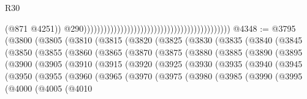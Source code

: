 \begin{lexlean}{R30}
\begin{coremodule}
                                                                                              (@871
                                                                                                @4251))
                                                                                            @290))))))))))))))))))))))))))))))))))))))))))))
@4348 := @3795
    (@3800
      (@3805
        (@3810
          (@3815
            (@3820
              (@3825
                (@3830
                  (@3835
                    (@3840
                      (@3845
                        (@3850
                          (@3855
                            (@3860
                              (@3865
                                (@3870
                                  (@3875
                                    (@3880
                                      (@3885
                                        (@3890
                                          (@3895
                                            (@3900
                                              (@3905
                                                (@3910
                                                  (@3915
                                                    (@3920
                                                      (@3925
                                                        (@3930
                                                          (@3935
                                                            (@3940
                                                              (@3945
                                                                (@3950
                                                                  (@3955
                                                                    (@3960
                                                                      (@3965
                                                                        (@3970
                                                                          (@3975
                                                                            (@3980
                                                                              (@3985
                                                                                (@3990
                                                                                  (@3995
                                                                                    (@4000
                                                                                      (@4005
                                                                                        (@4010

\end{coremodule}
\end{lexlean}
